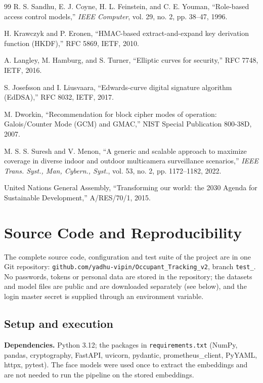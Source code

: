 \documentclass[12pt,a4paper,oneside]{report}
\begin{document}
\begin{thebibliography}{99}
R. S. Sandhu, E. J. Coyne, H. L. Feinstein, and C. E. Youman,
``Role-based access control models,''
\textit{IEEE Computer},
vol. 29, no. 2, pp. 38--47,
1996.

H. Krawczyk and P. Eronen,
``HMAC-based extract-and-expand key derivation function (HKDF),''
RFC 5869, IETF, 2010.

A. Langley, M. Hamburg, and S. Turner,
``Elliptic curves for security,''
RFC 7748, IETF, 2016.

S. Josefsson and I. Liusvaara,
``Edwards-curve digital signature algorithm (EdDSA),''
RFC 8032, IETF, 2017.

M. Dworkin,
``Recommendation for block cipher modes of operation: Galois/Counter Mode (GCM) and GMAC,''
NIST Special Publication 800-38D, 2007.

M. S. S. Suresh and V. Menon,
``A generic and scalable approach to maximize coverage in diverse indoor and outdoor multicamera surveillance scenarios,''
\textit{IEEE Trans. Syst., Man, Cybern., Syst.},
vol. 53, no. 2, pp. 1172--1182,
2022.

United Nations General Assembly,
``Transforming our world: the 2030 Agenda for Sustainable Development,''
A/RES/70/1, 2015.

\end{thebibliography}
\clearpage
\appendix\chapter{Source Code and Reproducibility}
The complete source code, configuration and test suite of the project are in one Git repository: \texttt{github.com/yadhu-vipin/Occupant\_\allowbreak Tracking\_\allowbreak v2}, branch \texttt{test\_}. No passwords, tokens or personal data are stored in the repository; the datasets and model files are public and are downloaded separately (see below), and the login master secret is supplied through an environment variable.

\section{Setup and execution}\label{app:setup}
\textbf{Dependencies.} Python 3.12; the packages in \texttt{requirements.txt} (NumPy, pandas, cryptography, FastAPI, uvicorn, pydantic, prometheus\_\allowbreak client, PyYAML, httpx, pytest). The face models were used once to extract the embeddings and are not needed to run the pipeline on the stored embeddings.
\end{document}
